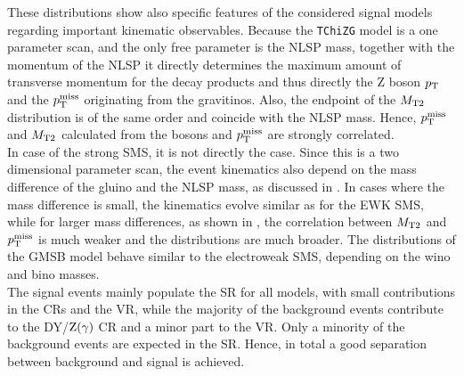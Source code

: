 These distributions show also specific features of the considered signal models regarding important kinematic observables. Because the \texttt{TChiZG} model is a one parameter scan, and the only free parameter is the NLSP mass, together with the momentum of the NLSP it directly determines the maximum amount of transverse momentum for the decay products and thus directly the Z boson $p_{\mathrm{T}}$ and the $p_{\mathrm{T}}^\text{miss}$ originating from the gravitinos. Also, the endpoint of the $M_{\mathrm{T2}}$ distribution is of the same order and coincide with the NLSP mass. Hence, $p_{\mathrm{T}}^\text{miss}$ and $M_{\mathrm{T2}}$ calculated from the bosons and $p_{\mathrm{T}}^\text{miss}$ are strongly correlated.\\
In case of the strong SMS, it is not directly the case. Since this is a two dimensional parameter scan, the event kinematics also depend on the mass difference of the gluino and the NLSP mass, as discussed in . In cases where the mass difference is small, the kinematics evolve similar as for the EWK SMS, while for larger mass differences, as shown in , the correlation between $M_{\mathrm{T2}}$ and $p_{\mathrm{T}}^\text{miss}$ is much weaker and the distributions are much broader. The distributions of the GMSB model behave similar to the electroweak SMS, depending on the wino and bino masses.\\
The signal events mainly populate the SR for all models, with small contributions in the CRs and the VR, while the majority of the background events contribute to the DY/$\mathrm{Z}(\gamma)$ CR and a minor part to the VR. Only a minority of the background events are expected in the SR. Hence, in total a good separation between background and signal is achieved.


